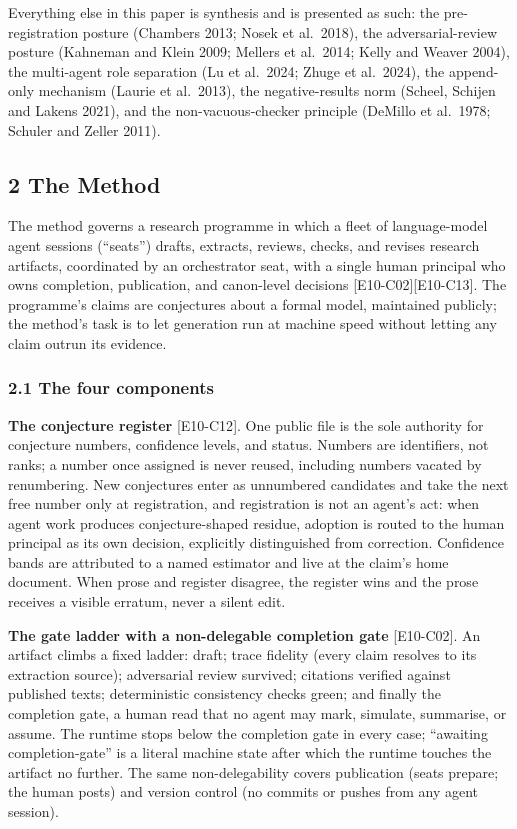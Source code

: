 \documentclass[
  11pt,
]{article}
\begin{document}
Everything else in this paper is synthesis and is presented as such: the
pre-registration posture (Chambers 2013; Nosek et al.~2018), the
adversarial-review posture (Kahneman and Klein 2009; Mellers et
al.~2014; Kelly and Weaver 2004), the multi-agent role separation (Lu et
al.~2024; Zhuge et al.~2024), the append-only mechanism (Laurie et
al.~2013), the negative-results norm (Scheel, Schijen and Lakens 2021),
and the non-vacuous-checker principle (DeMillo et al.~1978; Schuler and
Zeller 2011).

\subsection{2 The Method}\label{the-method}

The method governs a research programme in which a fleet of
language-model agent sessions (``seats'') drafts, extracts, reviews,
checks, and revises research artifacts, coordinated by an orchestrator
seat, with a single human principal who owns completion, publication,
and canon-level decisions {[}E10-C02{]}{[}E10-C13{]}. The programme's
claims are conjectures about a formal model, maintained publicly; the
method's task is to let generation run at machine speed without letting
any claim outrun its evidence.

\subsubsection{2.1 The four components}\label{the-four-components}

\textbf{The conjecture register} {[}E10-C12{]}. One public file is the
sole authority for conjecture numbers, confidence levels, and status.
Numbers are identifiers, not ranks; a number once assigned is never
reused, including numbers vacated by renumbering. New conjectures enter
as unnumbered candidates and take the next free number only at
registration, and registration is not an agent's act: when agent work
produces conjecture-shaped residue, adoption is routed to the human
principal as its own decision, explicitly distinguished from correction.
Confidence bands are attributed to a named estimator and live at the
claim's home document. When prose and register disagree, the register
wins and the prose receives a visible erratum, never a silent edit.

\textbf{The gate ladder with a non-delegable completion gate}
{[}E10-C02{]}. An artifact climbs a fixed ladder: draft; trace fidelity
(every claim resolves to its extraction source); adversarial review
survived; citations verified against published texts; deterministic
consistency checks green; and finally the completion gate, a human read
that no agent may mark, simulate, summarise, or assume. The runtime
stops below the completion gate in every case; ``awaiting
completion-gate'' is a literal machine state after which the runtime
touches the artifact no further. The same non-delegability covers
publication (seats prepare; the human posts) and version control (no
commits or pushes from any agent session).
\end{document}
